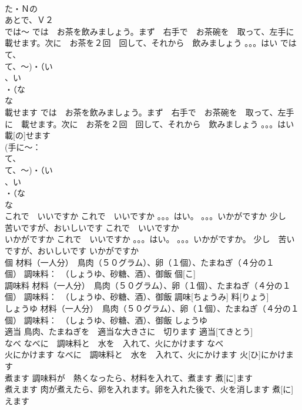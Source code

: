 \documentclass[8pt]{extreport}
\begin{document}
\begin{CJK}{UTF8}{min}
\\	た・Ｎの
\\	あとで、Ｖ２
\\	では～	では　お茶を飲みましょう。まず　右手で　お茶碗を　取って、左手に　載せます。次に　お茶を２回　回して、それから　飲みましょう 。。。はい	では~			
\\	て、
\\	て、～)・（い
\\	、い
\\	・（な
\\	な
\\	載せます	では　お茶を飲みましょう。まず　右手で　お茶碗を　取って、左手に　載せます。次に　お茶を２回　回して、それから　飲みましょう 。。。はい	載[の]せます			
\\	(手に～： 
\\	て、
\\	て、～)・（い
\\	、い
\\	・（な
\\	な
\\	これで　いいですか	これで　いいですか 。。。はい。 。。。いかがですか 少し　苦いですが、おいしいです	これで　いいですか			
\\	いかがですか	これで　いいですか 。。。はい。 。。。いかがですか。 少し　苦いですが、おいしいです	いかがですか			
\\	個	材料（一人分）　鳥肉（５０グラム）、卵（１個）、たまねぎ（４分の１
\\	個） 調味料：　（しょうゆ、砂糖、酒）、御飯	個[こ]			
\\	調味料	材料（一人分）　鳥肉（５０グラム）、卵（１個）、たまねぎ（４分の１
\\	個） 調味料：　（しょうゆ、砂糖、酒）、御飯	調味[ちょうみ] 料[りょう]			
\\	しょうゆ	材料（一人分）　鳥肉（５０グラム）、卵（１個）、たまねぎ（４分の１
\\	個） 調味料：　（しょうゆ、砂糖、酒）、御飯	しょうゆ						
\\	適当	鳥肉、たまねぎを　適当な大きさに　切ります	適当[てきとう]			
\\	なべ	なべに　調味料と　水を　入れて、火にかけます	なべ			
\\	火にかけます	なべに　調味料と　水を　入れて、火にかけます	火[ひ]にかけます			
\\	煮ます	調味料が　熱くなったら、材料を入れて、煮ます	煮[に]ます			
\\	煮えます	肉が煮えたら、卵を入れます。卵を入れた後で、火を消します	煮[に]えます			

\end{CJK}
\end{document}
